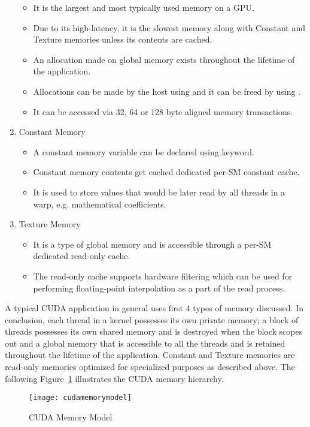 \documentclass[thesis.tex]{subfiles}
\begin{document}
\begin{enumerate}
\begin{itemize}
		\item It is the largest and most typically used memory on a GPU.
		\item Due to its high-latency, it is the slowest memory along with Constant and Texture memories unless its contents are cached.
		\item An allocation made on global memory exists throughout the lifetime of the application.
		\item Allocations can be made by the host using  and it can be freed by using .
		\item It can be accessed via 32, 64 or 128 byte aligned memory transactions.
	\end{itemize}
	\item Constant Memory
	\begin{itemize}
		\item A constant memory variable can be declared using  keyword.
		\item Constant memory contents get cached dedicated per-SM constant cache.
		\item It is used to store values that would be later read by all threads in a warp, e.g. mathematical coefficients.
	\end{itemize}
	\item Texture Memory
	\begin{itemize}
		\item It is a type of global memory and is accessible through a per-SM dedicated read-only cache.
		\item The read-only cache supports hardware filtering  which can be used for performing floating-point interpolation as a part of the read process.
	\end{itemize}
\end{enumerate}
A typical CUDA application in general uses first 4 types of memory discussed. In conclusion, each thread in a kernel possesses its own private memory; a block of threads possesses its own shared memory and is destroyed when the block scopes out and a global memory that is accessible to all the threads and is retained throughout the lifetime of the application. Constant and Texture memories are read-only memories optimized for specialized purposes as described above. The following Figure~\ref{fig:cudamemorymodel} illustrates the CUDA memory hierarchy.

\begin{figure}[H]
	\centering
	\texttt{[image: cudamemorymodel]}
	\caption{CUDA Memory Model~\cite{profCUDA}}
	\label{fig:cudamemorymodel}
\end{figure}
\end{document}
